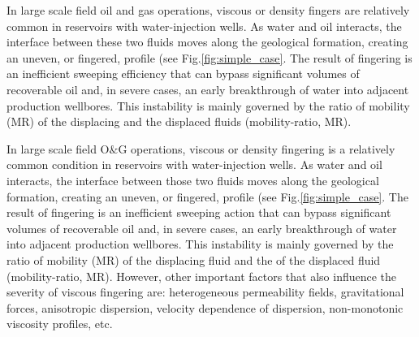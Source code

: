\documentclass[preprint,authoryear,12pt]{elsarticle}
\begin{document}
\medskip
In large scale field oil and gas operations, viscous or density fingers are relatively common in reservoirs with water-injection wells. As water and oil interacts, the interface between these two fluids moves along the geological formation, creating an uneven, or fingered, profile (see Fig.\ref{fig:simple_case}. The result of fingering is an inefficient sweeping efficiency that can bypass significant volumes of recoverable oil and, in severe cases, an early breakthrough of water into adjacent production wellbores. This instability is mainly governed by the ratio of mobility (MR) of the displacing and the displaced fluids (mobility-ratio, MR). %

\medskip
In large scale field O$\&$G operations, viscous or density fingering is a relatively common condition in reservoirs with water-injection wells. As water and oil interacts, the interface between those two fluids moves along the geological formation, creating an uneven, or fingered, profile (see Fig.\ref{fig:simple_case}. The result of fingering is an inefficient sweeping action that can bypass significant volumes of recoverable oil and, in severe cases, an early breakthrough of water into adjacent production wellbores. This instability is mainly governed by the ratio of mobility (MR) of the displacing fluid and the of the displaced fluid (mobility-ratio, MR). %
However, other important factors that also influence the severity of viscous fingering are: heterogeneous permeability fields, gravitational forces, anisotropic dispersion, velocity dependence of dispersion, non-monotonic viscosity profiles, etc.
\end{document}
